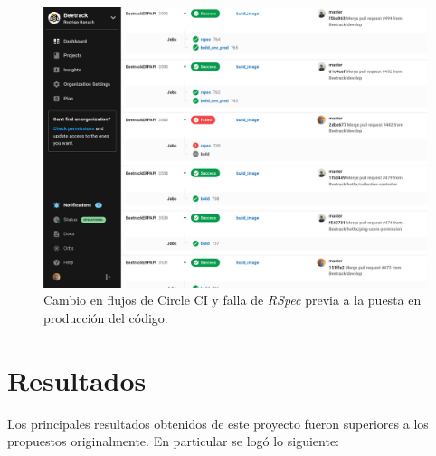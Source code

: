  \begin{figure}
    \centering
    \includegraphics[width=\linewidth]{figures/testing/circle_ci_flow.png}
    \caption{Cambio en flujos de Circle CI y falla de \textit{RSpec} previa a la puesta en producción del código.}
    \label{fig:flujo_circle_ci}
  \end{figure}

\section{Resultados}

  Los principales resultados obtenidos de este proyecto fueron superiores a los propuestos originalmente. En particular se logó lo siguiente:
  
